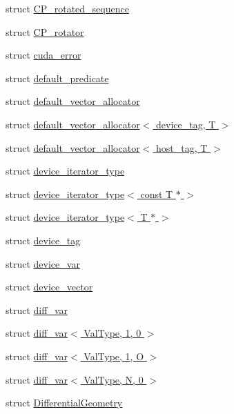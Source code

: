 \begin{DoxyCompactItemize}
\item 
struct \hyperlink{structcugar_1_1_c_p__rotated__sequence}{C\+P\+\_\+rotated\+\_\+sequence}
\item 
struct \hyperlink{structcugar_1_1_c_p__rotator}{C\+P\+\_\+rotator}
\item 
struct \hyperlink{structcugar_1_1cuda__error}{cuda\+\_\+error}
\item 
struct \hyperlink{structcugar_1_1default__predicate}{default\+\_\+predicate}
\item 
struct \hyperlink{structcugar_1_1default__vector__allocator}{default\+\_\+vector\+\_\+allocator}
\item 
struct \hyperlink{structcugar_1_1default__vector__allocator_3_01device__tag_00_01_t_01_4}{default\+\_\+vector\+\_\+allocator$<$ device\+\_\+tag, T $>$}
\item 
struct \hyperlink{structcugar_1_1default__vector__allocator_3_01host__tag_00_01_t_01_4}{default\+\_\+vector\+\_\+allocator$<$ host\+\_\+tag, T $>$}
\item 
struct \hyperlink{structcugar_1_1device__iterator__type}{device\+\_\+iterator\+\_\+type}
\item 
struct \hyperlink{structcugar_1_1device__iterator__type_3_01const_01_t_01_5_01_4}{device\+\_\+iterator\+\_\+type$<$ const T $\ast$ $>$}
\item 
struct \hyperlink{structcugar_1_1device__iterator__type_3_01_t_01_5_01_4}{device\+\_\+iterator\+\_\+type$<$ T $\ast$ $>$}
\item 
struct \hyperlink{structcugar_1_1device__tag}{device\+\_\+tag}
\item 
struct \hyperlink{structcugar_1_1device__var}{device\+\_\+var}
\item 
struct \hyperlink{structcugar_1_1device__vector}{device\+\_\+vector}
\item 
struct \hyperlink{structcugar_1_1diff__var}{diff\+\_\+var}
\item 
struct \hyperlink{structcugar_1_1diff__var_3_01_val_type_00_011_00_010_01_4}{diff\+\_\+var$<$ Val\+Type, 1, 0 $>$}
\item 
struct \hyperlink{structcugar_1_1diff__var_3_01_val_type_00_011_00_01_o_01_4}{diff\+\_\+var$<$ Val\+Type, 1, O $>$}
\item 
struct \hyperlink{structcugar_1_1diff__var_3_01_val_type_00_01_n_00_010_01_4}{diff\+\_\+var$<$ Val\+Type, N, 0 $>$}
\item 
struct \hyperlink{structcugar_1_1_differential_geometry}{Differential\+Geometry}
\item 

\end{DoxyCompactItemize}
